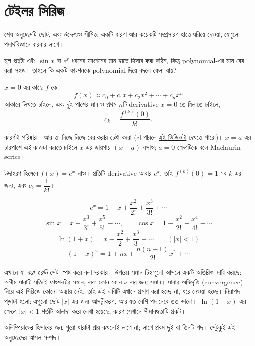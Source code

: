 \documentclass[11pt]{article}
\begin{document}
\section{টেইলর সিরিজ}

শেষ অনুচ্ছেদটি ছোট, এবং উদ্দেশ্যও সীমিত: একটি ধারণা আর কয়েকটি সম্প্রসারণ
হাতে ধরিয়ে দেওয়া, যেগুলো পদার্থবিজ্ঞানে বারবার লাগে।

মূল প্রশ্নটা এই: $\sin x$ বা $e^{x}$ ধরনের ফাংশনের মান হাতে হিসাব করা কঠিন,
কিন্তু polynomial-এর মান বের করা সহজ। তাহলে কি একটি ফাংশনকে polynomial দিয়ে
বদলে ফেলা যায়?

\begin{idea}
$x = 0$-এর কাছে $f$-কে
\[
  f(x) \approx c_{0} + c_{1}x + c_{2}x^{2} + \cdots + c_{n}x^{n}
\]
আকারে লিখতে চাইলে, এবং দুই পাশের মান ও প্রথম $n$টি derivative
$x=0$-তে মিলাতে চাইলে,
\[
  c_{k} = \frac{f^{(k)}(0)}{k!} .
\]
\end{idea}

কারণটা পরিষ্কার। আর তা নিজে নিজে বের করার চেষ্টা করো (না পারলে \hyperlink{https://www.youtube.com/watch?v=3d6DsjIBzJ4}{এই ভিডিওটা} দেখতে পারো)। $x = a$-এর চারপাশে এই কাজটা করতে চাইলে $x$-এর জায়গায় $(x-a)$ বসাও; $a=0$ ক্ষেত্রটিকে
বলে Maclaurin series।

উদাহরণ হিসেবে $f(x) = e^{x}$ নাও। প্রতিটি derivative আবার $e^{x}$, তাই
$f^{(k)}(0) = 1$ সব $k$-এর জন্য, এবং $c_{k} = \dfrac{1}{k!}$।

\begin{idea}[কয়েকটি দরকারি সম্প্রসারণ]
\[
  e^{x} = 1 + x + \frac{x^{2}}{2!} + \frac{x^{3}}{3!} + \cdots
\]
\[
  \sin x = x - \frac{x^{3}}{3!} + \frac{x^{5}}{5!} - \cdots, \qquad
  \cos x = 1 - \frac{x^{2}}{2!} + \frac{x^{4}}{4!} - \cdots
\]
\[
  \ln(1+x) = x - \frac{x^{2}}{2} + \frac{x^{3}}{3} - \cdots
  \qquad (|x| < 1)
\]
\[
  (1+x)^{n} = 1 + nx + \frac{n(n-1)}{2!}x^{2} + \cdots
\]
\end{idea}

\begin{remark}
এখানে যা \emph{করা হয়নি} সেটা স্পষ্ট করে বলা দরকার। উপরের সমান চিহ্নগুলো
আসলে একটি অতিরিক্ত দাবি করছে: অসীম ধারাটি সত্যিই ফাংশনটির সমান, এবং কোন
কোন $x$-এর জন্য সমান। ধারার অভিসৃতি (convergence) নিয়ে এই সিরিজে কোনো
অধ্যায় নেই, তাই এই দাবিটি এখানে প্রমাণ করা হচ্ছে না, ধরে নেওয়া হচ্ছে।
নিরাপদ পড়াটা হলো: এগুলো ছোট $|x|$-এর জন্য আসন্নীকরণ, আর যত বেশি পদ নেবে তত
ভালো। $\ln(1+x)$-এর ক্ষেত্রে $|x|<1$ শর্তটি আলাদা করে লেখা হয়েছে, কারণ
সেখানে সীমাবদ্ধতাটি প্রকট।

অলিম্পিয়াডের হিসাবের জন্য পুরো ধারাটা প্রায় কখনোই লাগে না; লাগে প্রথম দুই বা
তিনটি পদ। সেটুকুই এই অনুচ্ছেদের আসল সম্পদ।
\end{remark}
\end{document}
